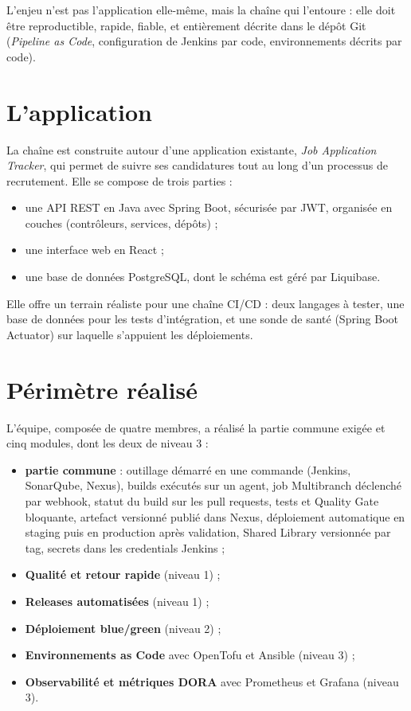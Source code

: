 \documentclass[11pt,a4paper]{report}
\begin{document}
L'enjeu n'est pas l'application elle-même, mais la chaîne qui l'entoure : elle doit être reproductible, rapide, fiable, et entièrement décrite dans le dépôt Git (\emph{Pipeline as Code}, configuration de Jenkins par code, environnements décrits par code).

\section*{L'application}
La chaîne est construite autour d'une application existante, \emph{Job Application Tracker}, qui permet de suivre ses candidatures tout au long d'un processus de recrutement. Elle se compose de trois parties :
\begin{itemize}
  \item une API REST en Java avec Spring Boot, sécurisée par JWT, organisée en couches (contrôleurs, services, dépôts) ;
  \item une interface web en React ;
  \item une base de données PostgreSQL, dont le schéma est géré par Liquibase.
\end{itemize}
Elle offre un terrain réaliste pour une chaîne CI/CD : deux langages à tester, une base de données pour les tests d'intégration, et une sonde de santé (Spring Boot Actuator) sur laquelle s'appuient les déploiements.

\section*{Périmètre réalisé}
L'équipe, composée de quatre membres, a réalisé la partie commune exigée et cinq modules, dont les deux de niveau 3 :
\begin{itemize}
  \item \textbf{partie commune} : outillage démarré en une commande (Jenkins, SonarQube, Nexus), builds exécutés sur un agent, job Multibranch déclenché par webhook, statut du build sur les pull requests, tests et Quality Gate bloquante, artefact versionné publié dans Nexus, déploiement automatique en staging puis en production après validation, Shared Library versionnée par tag, secrets dans les credentials Jenkins ;
  \item \textbf{Qualité et retour rapide} (niveau 1) ;
  \item \textbf{Releases automatisées} (niveau 1) ;
  \item \textbf{Déploiement blue/green} (niveau 2) ;
  \item \textbf{Environnements as Code} avec OpenTofu et Ansible (niveau 3) ;
  \item \textbf{Observabilité et métriques DORA} avec Prometheus et Grafana (niveau 3).
\end{itemize}
\end{document}
